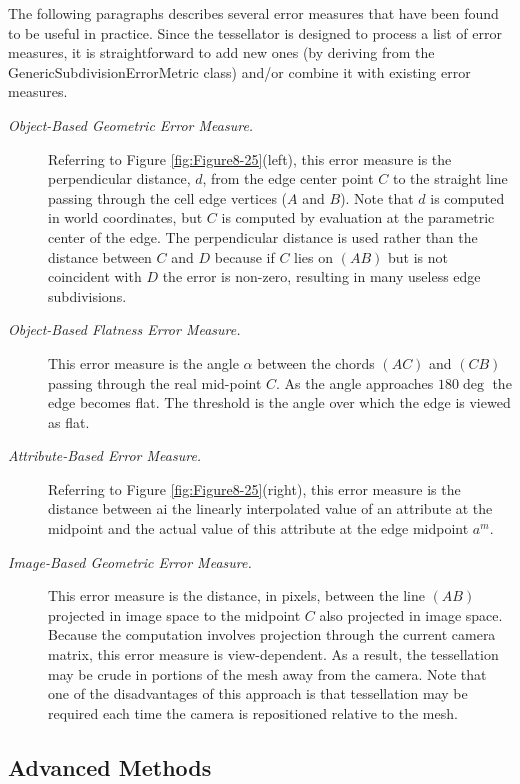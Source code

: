 The following paragraphs describes several error measures that have been found to be useful in practice. Since the tessellator is designed to process a list of error measures, it is straightforward to add new ones (by deriving from the GenericSubdivisionErrorMetric class) and/or combine it with existing error measures.
\begin{description}

    \item [\textit{Object-Based Geometric Error Measure.}] Referring to Figure \ref{fig:Figure8-25}(left), this error measure is the perpendicular distance, $d$, from the edge center point $C$ to the straight line passing through the cell edge vertices ($A$ and $B$). Note that $d$ is computed in world coordinates, but $C$ is computed by evaluation at the parametric center of the edge. The perpendicular distance is used rather than the distance between $C$ and $D$ because if $C$ lies on $(AB)$ but is not coincident with $D$ the error is non-zero, resulting in many useless edge subdivisions.

    \item [\textit{Object-Based Flatness Error Measure.}] This error measure is the angle $\alpha$ between the chords $(AC)$ and $(CB)$ passing through the real mid-point $C$. As the angle approaches $180\deg$ the edge becomes flat. The threshold is the angle over which the edge is viewed as flat.

    \item [\textit{Attribute-Based Error Measure.}] Referring to Figure \ref{fig:Figure8-25}(right), this error measure is the distance between ai the linearly interpolated value of an attribute at the midpoint and the actual value of this attribute at the edge midpoint $a^m$.

    \item [\textit{Image-Based Geometric Error Measure.}] This error measure is the distance, in pixels, between the line $(AB)$ projected in image space to the midpoint $C$ also projected in image space. Because the computation involves projection through the current camera matrix, this error measure is view-dependent. As a result, the tessellation may be crude in portions of the mesh away from the camera. Note that one of the disadvantages of this approach is that tessellation may be required each time the camera is repositioned relative to the mesh.

\end{description}

\subsection{Advanced Methods}

